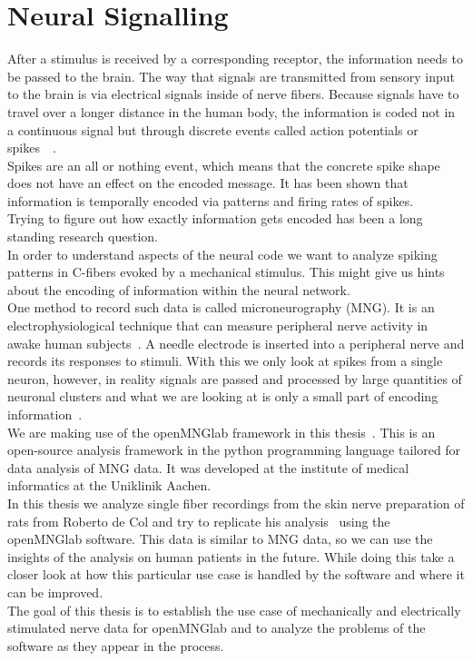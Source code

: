 \section{Neural Signalling}
After a stimulus is received by a corresponding receptor, the information needs to be passed to the brain.
The way that signals are transmitted from sensory input to the brain is via electrical signals inside of nerve fibers. Because signals have to travel over a longer distance in the human body, the information is coded not in a continuous signal but through discrete events called action potentials or spikes~\cite{rieke1999spikes}~\cite{spikeGeneral}.\\
Spikes are an all or nothing event, which means that the concrete spike shape does not have an effect on the encoded message. It has been shown that information is temporally encoded via patterns and firing rates of spikes.\\
Trying to figure out how exactly information gets encoded has been a long standing research question.\\
In order to understand aspects of the neural code we want to analyze spiking patterns in C-fibers evoked by a mechanical stimulus. This might give us hints about the encoding of information within the neural network. \\
One method to record such data is called microneurography (MNG). It is an electrophysiological technique that can measure peripheral nerve activity in awake human subjects~\cite{namer2009translational}. A needle electrode is inserted into a peripheral nerve and records its responses to stimuli. With this we only look at spikes from a single neuron, however, in reality signals are passed and processed by large quantities of neuronal clusters and what we are looking at is only a small part of encoding information~\cite{spikeGeneral}.\\
We are making use of the openMNGlab framework in this thesis~\cite{schlebusch_openmnglab_2021}. This is an open-source analysis framework in the python programming language tailored for data analysis of MNG data. It was developed at the institute of medical informatics at the Uniklinik Aachen.\\
In this thesis we analyze single fiber recordings from the skin nerve preparation of rats from Roberto de Col and try to replicate his analysis~\cite{roberto} using the openMNGlab software. This data is similar to MNG data, so we can use the insights of the analysis on human patients in the future. While doing this take a closer look at how this particular use case is handled by the software and where it can be improved.\\
The goal of this thesis is to establish the use case of mechanically and electrically stimulated nerve data for openMNGlab and to analyze the problems of the software as they appear in the process.

